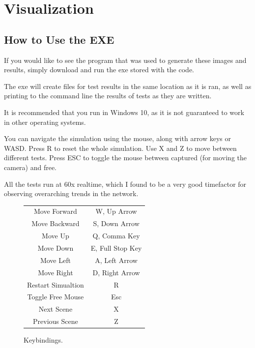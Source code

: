 \documentclass[12pt]{report}
\begin{document}
\section{Visualization}



\subsection{How to Use the EXE}

If you would like to see the program that was used to generate these images and results, simply download and run the exe stored with the code.

The exe will create files for test results in the same location as it is ran, as well as printing to the command line the results of tests as they are written.

It is recommended that you run in Windows 10, as it is not guaranteed to work in other operating systems.

You can navigate the simulation using the mouse, along with arrow keys or WASD. Press R to reset the whole simulation. Use X and Z to move between different tests. Press ESC to toggle the mouse between captured (for moving the camera) and free.

All the tests run at 60x realtime, which I found to be a very good timefactor for observing overarching trends in the network.

\begin{figure}
\begin{center}
\label{fig:Keybindings}
\caption{Keybindings.}
\begin{tabular}{ | c | c  | }
	\hline
	Move Forward & W, Up Arrow \\
	Move Backward & S, Down Arrow\\
	Move Up & Q, Comma Key\\
	Move Down & E, Full Stop Key\\
	Move Left & A, Left Arrow \\
	Move Right & D, Right Arrow \\
	Restart Simualtion & R \\
	Toggle Free Mouse & Esc \\
	Next Scene & X\\
	Previous Scene & Z\\
	\hline
\end{tabular}
\end{center}
\end{figure}
\end{document}
